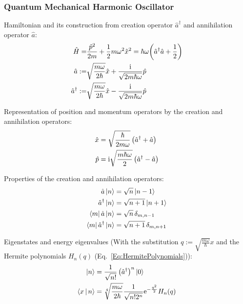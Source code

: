 		\subsubsection{Quantum Mechanical Harmonic Oscillator}
			\noindent
			Hamiltonian and its construction from creation operator $\hat{a}^\dagger$ and annihilation operator $\hat{a}$:
			\begin{equation}
				\begin{aligned}
					\hat{H} =& \frac{\hat{p}^2}{2m} + \frac{1}{2}m\omega^2 \hat{x}^2 = \hbar\omega\qty(\hat{a}^\dagger \hat{a} + \frac{1}{2}) \\
					\hat{a} :=& \sqrt{\frac{m\omega}{2\hbar}}\hat{x} + \frac{\mathrm{i}}{\sqrt{2m\hbar\omega}}\hat{p} \\
					\hat{a}^\dagger :=& \sqrt{\frac{m\omega}{2\hbar}}\hat{x} - \frac{\mathrm{i}}{\sqrt{2m\hbar\omega}}\hat{p} \\
				\end{aligned}
			\end{equation}

			\noindent
			Representation of position and momentum operators by the creation and annihilation operators:
			\begin{equation}
				\begin{aligned}
					\hat{x} &= \sqrt{\frac{\hbar}{2m\omega}}\left(\hat{a}^\dagger + \hat{a} \right) \\
					\hat{p} &= \mathrm{i}\sqrt{\frac{m\hbar\omega}{2}}\left(\hat{a}^\dagger - \hat{a} \right) \\
				\end{aligned}
			\end{equation}

			\noindent
			Properties of the creation and annihilation operators:
			\begin{equation}
				\begin{aligned}
					\hat{a}\Ket{n} &= \sqrt{n}\Ket{n-1} \\
					\hat{a}^\dagger\Ket{n} &= \sqrt{n+1}\Ket{n+1} \\
					\Bra{m}\hat{a}\Ket{n} &= \sqrt{n} \,\delta_{m,n-1} \\
					\Bra{m}\hat{a}^\dagger\Ket{n} &= \sqrt{n+1} \,\delta_{m,n+1} \\
				\end{aligned}
			\end{equation}

			\noindent
			Eigenstates and energy eigenvalues (With the substitution $q:=\sqrt{\frac{m\omega}{\hbar}}x$ and the Hermite polynomials $H_n(q)$ (Eq.~\ref{Eq:HermitePolynomials})):
			\begin{equation}
				\begin{aligned}
					\Ket{n} &= \frac{1}{\sqrt{n!}}\left(\hat{a}^\dagger\right)^n\Ket{0} \\
					\Braket{x|n} &= \sqrt[4]{\frac{m\omega}{2\hbar}} \frac{1}{\sqrt{n! 2^n}} \mathrm{e}^{-\frac{q^2}{2}} H_n(q) \\
				\end{aligned}
			\end{equation}

